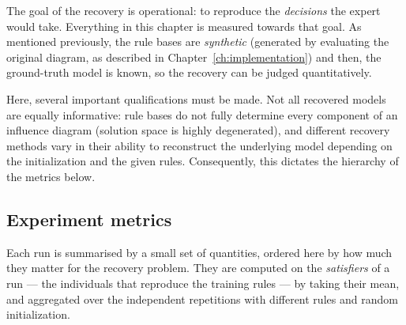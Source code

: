 The goal of the recovery is operational: to reproduce the
\emph{decisions} the expert would take. Everything in this chapter is
measured towards that goal. As mentioned previously, the rule bases are \emph{synthetic}
(generated by evaluating the original diagram, as described in
Chapter~\ref{ch:implementation}) and then, the ground-truth model is known, so
the recovery can be judged quantitatively.

Here, several important qualifications must be made. Not all recovered models are equally informative: rule bases do not fully determine every component of an influence diagram (solution space is highly degenerated), and different recovery methods vary in their ability to reconstruct the underlying model depending on the initialization and the given rules. Consequently, this dictates the hierarchy of the metrics below.

\subsection{Experiment metrics}
\label{sec:metrics}

Each run is summarised by a small set of quantities, ordered here by how
much they matter for the recovery problem. They are computed on the
\emph{satisfiers} of a run --- the individuals that reproduce the training rules
--- by taking their mean, and aggregated over the independent repetitions with different rules and random initialization.

